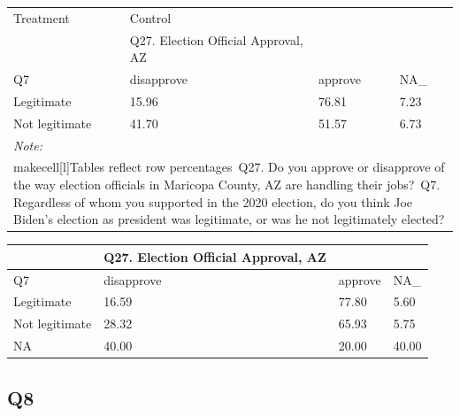\documentclass[
  11pt,
  a4paper,
]{article}
\begin{document}
\begin{table}
\centering
\centering
\begin{tabular}[t]{l|l|l|l}
\hline
\multicolumn{1}{l|}{Treatment} & \multicolumn{1}{l}{Control} \\
\cline{1-1} \cline{2-2}
 & Q27. Election Official Approval, AZ &  & \\
\hline
Q7 & disapprove & approve & NA\_\\
\hline
Legitimate & 15.96 & 76.81 & 7.23\\
\hline
Not legitimate & 41.70 & 51.57 & 6.73\\
\hline
\multicolumn{4}{l}{\rule{0pt}{1em}\textit{Note: }}\\
\multicolumn{4}{l}{\rule{0pt}{1em}makecell[l]{Tables reflect row percentages\ Q27. Do you approve or disapprove of the way election officials in Maricopa County, AZ are handling their jobs?\ Q7. Regardless of whom you supported in the 2020 election, do you think Joe Biden's election as president was legitimate, or was he not legitimately elected?}}\\
\end{tabular}
\centering
\begin{tabular}[t]{l|l|l|l}
\hline
 & Q27. Election Official Approval, AZ &  & \\
\hline
Q7 & disapprove & approve & NA\_\\
\hline
Legitimate & 16.59 & 77.80 & 5.60\\
\hline
Not legitimate & 28.32 & 65.93 & 5.75\\
\hline
NA & 40.00 & 20.00 & 40.00\\
\hline
\end{tabular}
\end{table}

\subsection{Q8}\label{q8}
\end{document}
